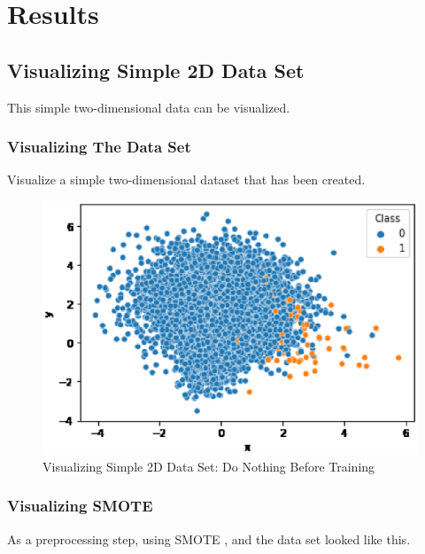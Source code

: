 \chapter{Results}
\section{Visualizing Simple 2D Data Set}
This simple two-dimensional data can be visualized. 

\subsection{Visualizing The Data Set}
Visualize a simple two-dimensional dataset that has been created.

\begin{center}
    \begin{figure}[ht]
        \caption{Visualizing Simple 2D Data Set: Do Nothing Before Training}
        \label{tab:team-rating-features}
        \begin{center}
            \includegraphics[scale=0.6]{image/no-prepro.eps}
        \end{center}
    \end{figure}
\end{center}

\clearpage
\subsection{Visualizing SMOTE}
As a preprocessing step, using SMOTE , and the data set looked like this.

